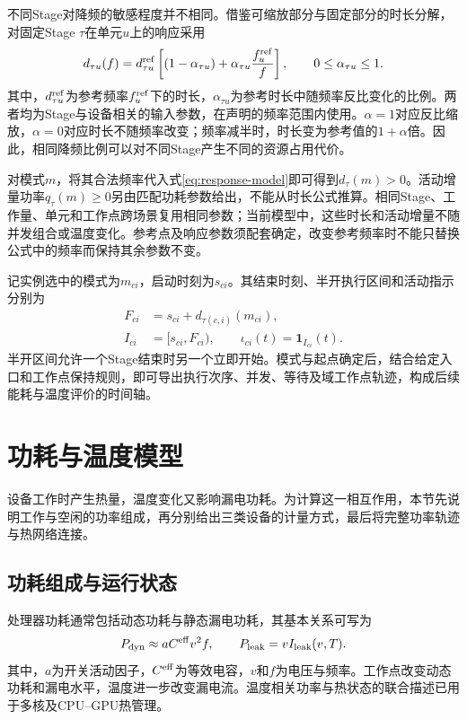 不同Stage对降频的敏感程度并不相同。借鉴可缩放部分与固定部分的时长分解\cite{source2}，对固定Stage \(\tau\)在单元\(u\)上的响应采用
\begin{equation}
d_{\tau u}(f)=d^{\rm ref}_{\tau u}
\left[(1-\alpha_{\tau u})+\alpha_{\tau u}\frac{f_u^{\rm ref}}{f}\right],
\qquad 0\le\alpha_{\tau u}\le1.
\label{eq:response-model}
\end{equation}
其中，\(d^{\rm ref}_{\tau u}\)为参考频率\(f_u^{\rm ref}\)下的时长，\(\alpha_{\tau u}\)为参考时长中随频率反比变化的比例。两者均为Stage与设备相关的输入参数，在声明的频率范围内使用。\(\alpha=1\)对应反比缩放，\(\alpha=0\)对应时长不随频率改变；频率减半时，时长变为参考值的\(1+\alpha\)倍。因此，相同降频比例可以对不同Stage产生不同的资源占用代价。

对模式\(m\)，将其合法频率代入式\eqref{eq:response-model}即可得到\(d_\tau(m)>0\)。活动增量功率\(q_\tau(m)\ge0\)另由匹配功耗参数给出，不能从时长公式推算。相同Stage、工作量、单元和工作点跨场景复用相同参数；当前模型中，这些时长和活动增量不随并发组合或温度变化。参考点及响应参数须配套确定，改变参考频率时不能只替换公式中的频率而保持其余参数不变。

记实例选中的模式为\(m_{ci}\)，启动时刻为\(s_{ci}\)。其结束时刻、半开执行区间和活动指示分别为
\begin{equation}
\begin{aligned}
F_{ci}&=s_{ci}+d_{\tau(c,i)}(m_{ci}),\\
I_{ci}&=[s_{ci},F_{ci}),\qquad
\iota_{ci}(t)=\mathbf1_{I_{ci}}(t).
\end{aligned}
\label{eq:execution-interval}
\end{equation}
半开区间允许一个Stage结束时另一个立即开始。模式与起点确定后，结合给定入口和工作点保持规则，即可导出执行次序、并发、等待及域工作点轨迹，构成后续能耗与温度评价的时间轴。

\section{功耗与温度模型}

设备工作时产生热量，温度变化又影响漏电功耗。为计算这一相互作用，本节先说明工作与空闲的功率组成，再分别给出三类设备的计量方式，最后将完整功率轨迹与热网络连接。

\subsection{功耗组成与运行状态}

处理器功耗通常包括动态功耗与静态漏电功耗，其基本关系可写为\cite{source1}
\begin{equation}
P_{\rm dyn}\approx aC^{\rm eff}v^2f,\qquad
P_{\rm leak}=vI_{\rm leak}(v,T).
\label{eq:physical-power}
\end{equation}
其中，\(a\)为开关活动因子，\(C^{\rm eff}\)为等效电容，\(v\)和\(f\)为电压与频率。工作点改变动态功耗和漏电水平，温度进一步改变漏电流。温度相关功率与热状态的联合描述已用于多核及CPU--GPU热管理\cite{chantem2011,fdtm2022}。

